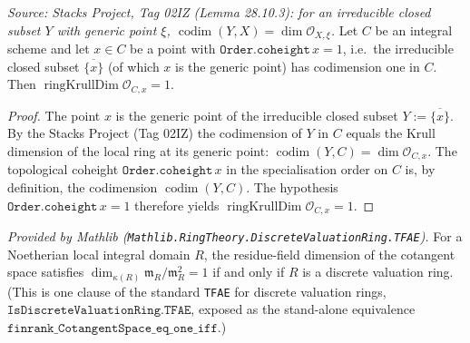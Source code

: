 \begin{lemma}

  \label{lem:coheight_eq_ringKrullDim_stalk}
  \textit{Source: Stacks Project, Tag 02IZ (Lemma 28.10.3): for an
  irreducible closed subset \(Y\) with generic point \(\xi\),
  \(\operatorname{codim}(Y, X) = \dim \mathcal O_{X, \xi}\).}
  Let \(C\) be an integral scheme and let \(x \in C\) be a point with
  \(\texttt{Order.coheight}\,x = 1\), i.e.\ the irreducible closed subset
  \(\overline{\{x\}}\) (of which \(x\) is the generic point) has
  codimension one in \(C\). Then \(\operatorname{ringKrullDim}
  \mathcal O_{C, x} = 1\).
\end{lemma}

\begin{proof}
  The point \(x\) is the generic point of the irreducible closed subset
  \(Y := \overline{\{x\}}\). By the Stacks Project (Tag 02IZ) the
  codimension of \(Y\) in \(C\) equals the Krull dimension of the local ring
  at its generic point:
  \(\operatorname{codim}(Y, C) = \dim \mathcal O_{C, x}\). The topological
  coheight \(\texttt{Order.coheight}\,x\) in the specialisation order on
  \(C\) is, by definition, the codimension \(\operatorname{codim}(Y, C)\).
  The hypothesis \(\texttt{Order.coheight}\,x = 1\) therefore yields
  \(\operatorname{ringKrullDim} \mathcal O_{C, x} = 1\).
\end{proof}

\begin{lemma}
  \label{lem:finrank_cotangentSpace_eq_one_iff_isDVR}
  \mathlibok
  \textit{Provided by Mathlib
  (\texttt{Mathlib.RingTheory.DiscreteValuationRing.TFAE}).}
  For a Noetherian local integral domain \(R\), the residue-field dimension
  of the cotangent space satisfies
  \(\dim_{\kappa(R)} \mathfrak m_R / \mathfrak m_R^2 = 1\) if and only if
  \(R\) is a discrete valuation ring. (This is one clause of the standard
  \texttt{TFAE} for discrete valuation rings,
  \(\texttt{IsDiscreteValuationRing.TFAE}\), exposed as the stand-alone
  equivalence \(\texttt{finrank\_CotangentSpace\_eq\_one\_iff}\).)
\end{lemma}

